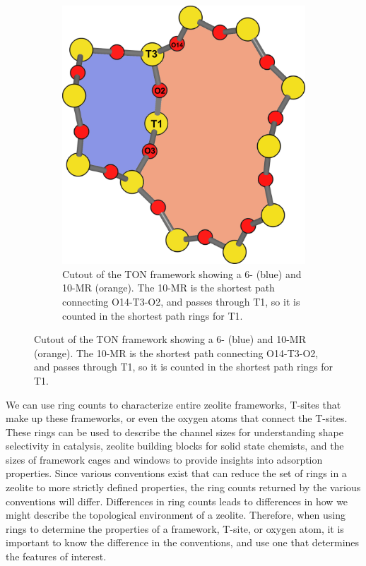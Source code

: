\documentclass[preprint,numrefs,noinfo,sort&compress]{elsarticle}
\begin{document}
\begin{figure}
\begin{figure}[H]
\centering
\includegraphics[width=\textwidth]{figures/chapter-3/ton-6-10.pdf}
\caption{Cutout of the TON framework showing a 6- (blue) and 10-MR (orange). The 10-MR is the shortest path connecting O14-T3-O2, and passes through T1, so it is counted in the shortest path rings for T1. \label{fig:3.4}}
\end{figure}
\end{figure}

We can use ring counts to characterize entire zeolite frameworks, T-sites that make up these frameworks, or even the oxygen atoms that connect the T-sites. These rings can be used to describe the channel sizes for understanding shape selectivity in catalysis, zeolite building blocks for solid state chemists, and the sizes of framework cages and windows to provide insights into adsorption properties. Since various conventions exist that can reduce the set of rings in a zeolite to more strictly defined properties, the ring counts returned by the various conventions will differ. Differences in ring counts leads to differences in how we might describe the topological environment of a zeolite. Therefore, when using rings to determine the properties of a framework, T-site, or oxygen atom, it is important to know the difference in the conventions, and use one that determines the features of interest.  
\end{document}
